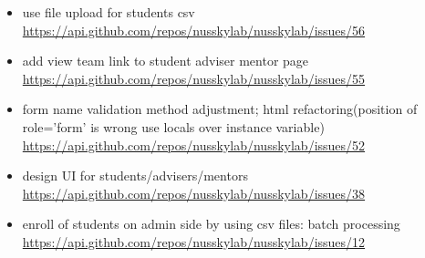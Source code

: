 {\begin{itemize}[noitemsep]
    \item use file upload for students csv \url{https://api.github.com/repos/nusskylab/nusskylab/issues/56} 
    \item add view team link to student  adviser  mentor page \url{https://api.github.com/repos/nusskylab/nusskylab/issues/55} 
    \item form name validation method adjustment; html refactoring(position of role='form' is wrong  use locals over instance variable) \url{https://api.github.com/repos/nusskylab/nusskylab/issues/52} 
    \item design UI for students/advisers/mentors \url{https://api.github.com/repos/nusskylab/nusskylab/issues/38} 
    \item enroll of students on admin side by using csv files: batch processing \url{https://api.github.com/repos/nusskylab/nusskylab/issues/12} 
\end{itemize}

}

